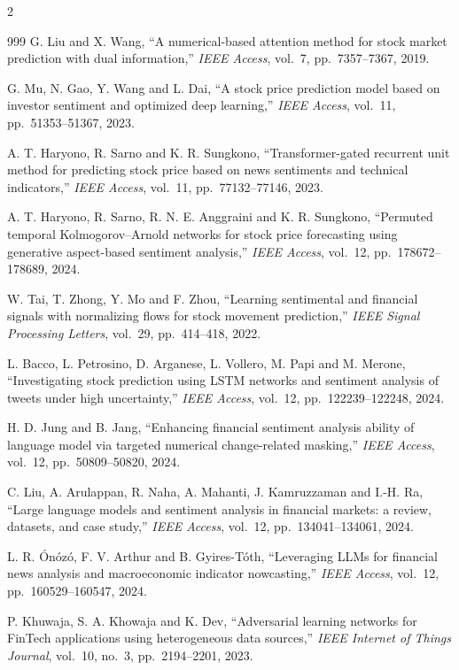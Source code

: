 \begin{footnotesize}
\begin{multicols}{2}
\begin{thebibliography}{999}
 G. Liu and X. Wang, ``A numerical-based attention method for stock
market prediction with dual information,'' \emph{IEEE Access}, vol.~7, pp.~7357--7367, 2019.

 G. Mu, N. Gao, Y. Wang and L. Dai, ``A stock price prediction model
based on investor sentiment and optimized deep learning,'' \emph{IEEE Access}, vol.~11,
pp.~51353--51367, 2023.

 A. T. Haryono, R. Sarno and K. R. Sungkono, ``Transformer-gated
recurrent unit method for predicting stock price based on news sentiments and technical
indicators,'' \emph{IEEE Access}, vol.~11, pp.~77132--77146, 2023.

 A. T. Haryono, R. Sarno, R. N. E. Anggraini and K. R. Sungkono,
``Permuted temporal Kolmogorov--Arnold networks for stock price forecasting using generative
aspect-based sentiment analysis,'' \emph{IEEE Access}, vol.~12, pp.~178672--178689, 2024.

 W. Tai, T. Zhong, Y. Mo and F. Zhou, ``Learning sentimental and financial
signals with normalizing flows for stock movement prediction,'' \emph{IEEE Signal Processing
Letters}, vol.~29, pp.~414--418, 2022.

 L. Bacco, L. Petrosino, D. Arganese, L. Vollero, M. Papi and M. Merone,
``Investigating stock prediction using LSTM networks and sentiment analysis of tweets under
high uncertainty,'' \emph{IEEE Access}, vol.~12, pp.~122239--122248, 2024.

 H. D. Jung and B. Jang, ``Enhancing financial sentiment analysis ability of
language model via targeted numerical change-related masking,'' \emph{IEEE Access}, vol.~12,
pp.~50809--50820, 2024.

 C. Liu, A. Arulappan, R. Naha, A. Mahanti, J. Kamruzzaman and
I.-H. Ra, ``Large language models and sentiment analysis in financial markets: a review,
datasets, and case study,'' \emph{IEEE Access}, vol.~12, pp.~134041--134061, 2024.

 L. R. \'On\'oz\'o, F. V. Arthur and B. Gyires-T\'oth, ``Leveraging LLMs
for financial news analysis and macroeconomic indicator nowcasting,'' \emph{IEEE Access},
vol.~12, pp.~160529--160547, 2024.

 P. Khuwaja, S. A. Khowaja and K. Dev, ``Adversarial learning networks
for FinTech applications using heterogeneous data sources,'' \emph{IEEE Internet of Things
Journal}, vol.~10, no.~3, pp.~2194--2201, 2023.


\end{thebibliography}
\end{multicols}
\end{footnotesize}
